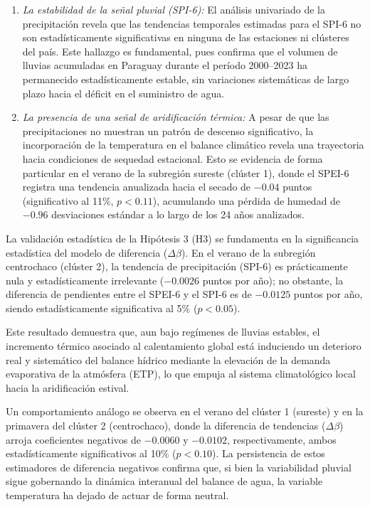 \begin{enumerate}
    \item \textit{La estabilidad de la señal pluvial (SPI-6):} El análisis univariado de la precipitación revela que las tendencias temporales estimadas para el SPI-6 no son estadísticamente significativas en ninguna de las estaciones ni clústeres del país. Este hallazgo es fundamental, pues confirma que el volumen de lluvias acumuladas en Paraguay durante el período 2000--2023 ha permanecido estadísticamente estable, sin variaciones sistemáticas de largo plazo hacia el déficit en el suministro de agua.
    \item \textit{La presencia de una señal de aridificación térmica:} A pesar de que las precipitaciones no muestran un patrón de descenso significativo, la incorporación de la temperatura en el balance climático revela una trayectoria hacia condiciones de sequedad estacional. Esto se evidencia de forma particular en el verano de la subregión sureste (clúster 1), donde el SPEI-6 registra una tendencia anualizada hacia el secado de $-0.04$ puntos (significativo al 11\%, $p < 0.11$), acumulando una pérdida de humedad de $-0.96$ desviaciones estándar a lo largo de los 24 años analizados.
\end{enumerate}

La validación estadística de la Hipótesis 3 (H3) se fundamenta en la significancia estadística del modelo de diferencia ($\Delta \beta$). En el verano de la subregión centrochaco (clúster 2), la tendencia de precipitación (SPI-6) es prácticamente nula y estadísticamente irrelevante ($-0.0026$ puntos por año); no obstante, la diferencia de pendientes entre el SPEI-6 y el SPI-6 es de ${-0.0125}$ puntos por año, siendo estadísticamente significativa al 5\% ($p < 0.05$). 

Este resultado demuestra que, aun bajo regímenes de lluvias estables, el incremento térmico asociado al calentamiento global está induciendo un deterioro real y sistemático del balance hídrico mediante la elevación de la demanda evaporativa de la atmósfera (ETP), lo que empuja al sistema climatológico local hacia la aridificación estival.

Un comportamiento análogo se observa en el verano del clúster 1 (sureste) y en la primavera del clúster 2 (centrochaco), donde la diferencia de tendencias ($\Delta \beta$) arroja coeficientes negativos de $-0.0060$ y $-0.0102$, respectivamente, ambos estadísticamente significativos al 10\% ($p < 0.10$). La persistencia de estos estimadores de diferencia negativos confirma que, si bien la variabilidad pluvial sigue gobernando la dinámica interanual del balance de agua, la variable temperatura ha dejado de actuar de forma neutral. 

